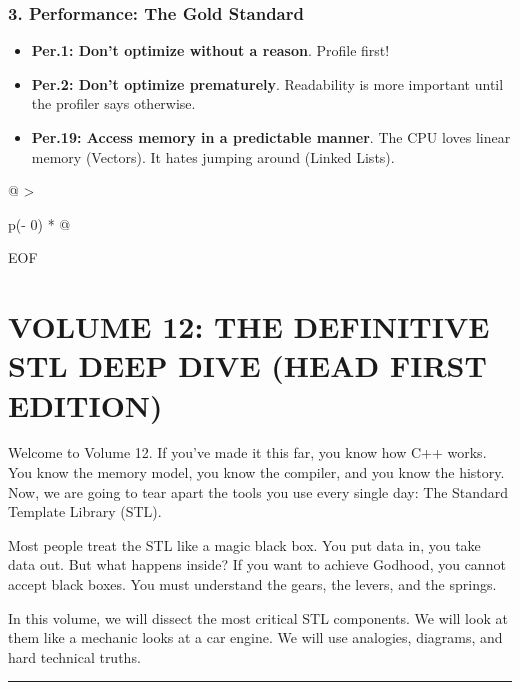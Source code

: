 \hypertarget{performance-the-gold-standard}{%
\subsubsection{3. Performance: The Gold
Standard}\label{performance-the-gold-standard}}

\begin{itemize}
\tightlist
\item
  \textbf{Per.1: Don't optimize without a reason}. Profile first!
\item
  \textbf{Per.2: Don't optimize prematurely}. Readability is more
  important until the profiler says otherwise.
\item
  \textbf{Per.19: Access memory in a predictable manner}. The CPU loves
  linear memory (Vectors). It hates jumping around (Linked Lists).
\end{itemize}

\begin{longtable}[]{@{}
  >{\raggedright\arraybackslash}p{(\columnwidth - 0\tabcolsep) * }@{}}
\toprule
\endhead
EOF \\
\bottomrule
\end{longtable}

\hypertarget{volume-12-the-definitive-stl-deep-dive-head-first-edition}{%
\section{VOLUME 12: THE DEFINITIVE STL DEEP DIVE (HEAD FIRST
EDITION)}\label{volume-12-the-definitive-stl-deep-dive-head-first-edition}}

Welcome to Volume 12. If you've made it this far, you know how C++
works. You know the memory model, you know the compiler, and you know
the history. Now, we are going to tear apart the tools you use every
single day: The Standard Template Library (STL).

Most people treat the STL like a magic black box. You put data in, you
take data out. But what happens inside? If you want to achieve Godhood,
you cannot accept black boxes. You must understand the gears, the
levers, and the springs.

In this volume, we will dissect the most critical STL components. We
will look at them like a mechanic looks at a car engine. We will use
analogies, diagrams, and hard technical truths.

\begin{center}\rule{0.5\linewidth}{0.5pt}\end{center}

